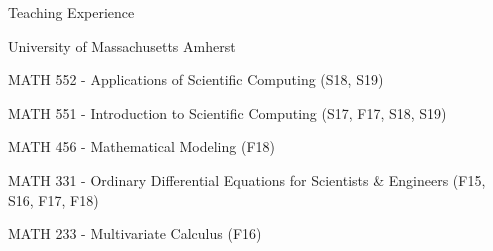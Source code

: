 \documentclass[10pt]{article} %
\newenvironment{outerlist}[1][\enskip\textbullet]%
        {\begin{itemize}[#1]}{\end{itemize}%
         \vspace{-.6\baselineskip}}
\newenvironment{innerlist}[1][\enskip\textbullet]%
        {\begin{compactitem}[#1]}{\end{compactitem}}
\begin{document}
\begin{section}{Teaching Experience}
\begin{outerlist}
\item[$\bullet$]
University of Massachusetts Amherst
\begin{innerlist}
\item[$\triangleright$] MATH 552 - Applications of Scientific Computing (S18, S19)
\item[$\triangleright$] MATH 551 - Introduction to Scientific Computing (S17, F17, S18, S19)
\item[$\triangleright$] MATH 456 - Mathematical Modeling (F18)
\item[$\triangleright$] MATH 331 - Ordinary Differential Equations for Scientists \& Engineers (F15, S16, F17, F18)
\item[$\triangleright$] MATH 233 - Multivariate Calculus (F16)

\end{innerlist}
\end{outerlist}
\end{section}
\end{document}
